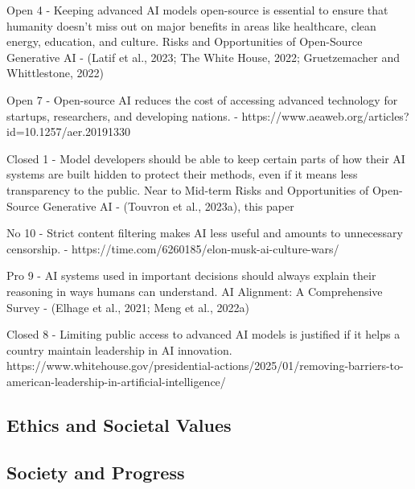 Open 4 - Keeping advanced AI models open-source is essential to ensure that humanity doesn't miss out on major benefits in areas like healthcare, clean energy, education, and culture.
Risks and Opportunities of Open-Source Generative AI
- (Latif et al., 2023; The White House, 2022; Gruetzemacher and Whittlestone, 2022)

Open 7 - Open-source AI reduces the cost of accessing advanced technology for startups, researchers, and developing nations.
- https://www.aeaweb.org/articles?id=10.1257/aer.20191330

Closed 1 - Model developers should be able to keep certain parts of how their AI systems are built hidden to protect their methods, even if it means less transparency to the public.
Near to Mid-term Risks and Opportunities of Open-Source Generative AI
- (Touvron et al., 2023a), this paper

No 10 - Strict content filtering makes AI less useful and amounts to unnecessary censorship.
- https://time.com/6260185/elon-musk-ai-culture-wars/

Pro 9 - AI systems used in important decisions should always explain their reasoning in ways humans can understand.
AI Alignment: A Comprehensive Survey
- (Elhage et al., 2021; Meng et al., 2022a)

Closed 8 - Limiting public access to advanced AI models is justified if it helps a country maintain leadership in AI innovation.
https://www.whitehouse.gov/presidential-actions/2025/01/removing-barriers-to-american-leadership-in-artificial-intelligence/

\subsection{Ethics and Societal Values}

\subsection{Society and Progress}

